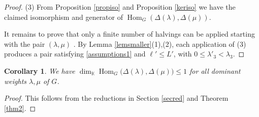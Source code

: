 \documentclass[11pt]{amsart}
\newtheorem{corollary}[theorem]{Corollary}
\theoremstyle{remark}
\theoremstyle{definition}
\newcommand{\Hom}{\operatorname{Hom}}
\newcommand{\D}{\Delta}
\newcommand{\la}{\lambda}
\newcommand{\K}{\mathbb K}
\numberwithin{equation}{section}
\begin{document}
\begin{proof}
	
	(3) From Proposition \ref{propiso} and Proposition \ref{keriso} we have the claimed isomorphism and generator of $\Hom_G(\D(\la),\D(\mu))$.
	
	It remains to prove that only  a finite number of halvings can be applied starting with the pair $(\la, \mu)$ . By
	Lemma \ref{lemsmaller}(1),(2), each application of (3)
	produces a pair satisfying \eqref{assumptions1} and
	$\ell'\le L'$, with $0\le\la'_3<\la_3$.
\end{proof}
	
\begin{corollary}\label{dimhom}We have $\dim_\K\Hom_G\bigl(\Delta(\la),\Delta(\mu)\bigr)\le1$ for all dominant weights $\la, \mu$ of $G$.
\end{corollary}
\begin{proof}This follows from the reductions in Section \ref{secred} and Theorem \ref{thm2}.
\end{proof}
\end{document}
